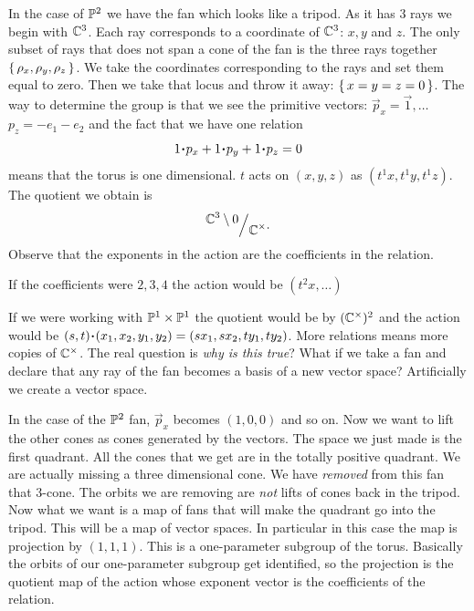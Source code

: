 \documentclass[12pt]{memoir}
\theoremstyle{definition}
\begin{document}
\begin{Ex}
    In the case of $\mathbb{P}^2$ we have the fan which looks like a tripod. As it has $3$ rays we begin with $\mathbb{C}^3$. Each ray corresponds to a coordinate of $\mathbb{C}^3$: $x,y$ and $z$. The only subset of rays that does not span a cone of the fan is the three rays together $\{\,\rho_x,\rho_y,\rho_z\,\}$. We take the coordinates corresponding to the rays and set them equal to zero. Then we take that locus and throw it away: $\{\,x=y=z=0\,\}$. The way to determine the group is that we see the primitive vectors: $\vec p_x=\vec 1,\dots$ $p_z=-e_1-e_2$ and the fact that we have one relation 
    $$1\.p_x+1\.p_y+1\.p_z=0$$
    means that the torus is one dimensional. $t$ acts on $(x,y,z)$ as $(t^1x,t^1y,t^1z)$. The quotient we obtain is 
    $$\quot{\bC^3\less 0}{\bC^\x}.$$
    Observe that the exponents in the action are the coefficients in the relation.
\end{Ex}

\begin{significant}
If the coefficients were $2,3,4$ the action would be $(t^2x,\dots)$
\end{significant}

If we were working with $\mathbb{P}^1\times\mathbb{P}^1$ the quotient would be by $(\mathbb{C}^\times)^2$ and the action would be $(s,t)\.(x_1,x_2,y_1,y_2)=(sx_1,sx_2,ty_1,ty_2)$. More relations means more copies of $\mathbb{C}^\times$. The real question is \emph{why is this true}? What if we take a fan and declare that any ray of the fan becomes a basis of a new vector space? Artificially we create a vector space.

\begin{Ex}
    In the case of the $\mathbb{P}^2$ fan, $\vec p_x$ becomes $(1,0,0)$ and so on. Now we want to lift the other cones as cones generated by the vectors. The space we just made is the first quadrant. All the cones that we get are in the totally positive quadrant. We are actually missing a three dimensional cone. We have \emph{removed} from this fan that 3-cone. The orbits we are removing are \emph{not} lifts of cones back in the tripod. Now what we want is a map of fans that will make the quadrant go into the tripod. This will be a map of vector spaces. In particular in this case the map is projection by $(1,1,1)$. This is a one-parameter subgroup of the torus. Basically the orbits of our one-parameter subgroup get identified, so the projection is the quotient map of the action whose exponent vector is the coefficients of the relation.
\end{Ex}
\end{document}
